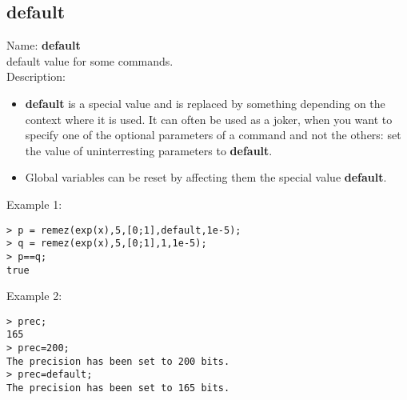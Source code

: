 \subsection{default}
\label{labdefault}
\noindent Name: \textbf{default}\\
default value for some commands.\\

\noindent Description: \begin{itemize}

\item \textbf{default} is a special value and is replaced by something depending on the 
   context where it is used. It can often be used as a joker, when you want to 
   specify one of the optional parameters of a command and not the others: set 
   the value of uninterresting parameters to \textbf{default}.

\item Global variables can be reset by affecting them the special value \textbf{default}.
\end{itemize}
\noindent Example 1: 
\begin{center}\begin{minipage}{15cm}\begin{Verbatim}[frame=single]
> p = remez(exp(x),5,[0;1],default,1e-5);
> q = remez(exp(x),5,[0;1],1,1e-5);
> p==q;
true
\end{Verbatim}
\end{minipage}\end{center}
\noindent Example 2: 
\begin{center}\begin{minipage}{15cm}\begin{Verbatim}[frame=single]
> prec;
165
> prec=200;
The precision has been set to 200 bits.
> prec=default;
The precision has been set to 165 bits.
\end{Verbatim}
\end{minipage}\end{center}
